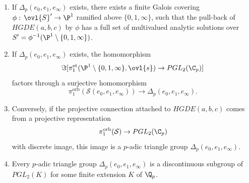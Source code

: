 \begin{pro}\label{pro::5.2.4}
 \begin{enumerate}
  \renewcommand{\theenumi}{\alph{enumi}}
  \item If $\Delta_p(e_0,e_1,e_\infty)$ exists,
	there exists a finite Galois covering 
	$\phi:\,\ovl{S}' \to \P^1$ ramified above $\{0,1,\infty\}$, such that
	the pull-back of $ HGDE(a,b,c) $ by $\phi$ has a full 
	set of multivalued analytic solutions over
	$S'=\phi^{-1}(\P^1\setminus\{0,1,\infty\})$.
  \item If $\Delta_p(e_0,e_1,e_\infty)$ exists, the homomorphism
	\begin{equation*}
	 \Im[\pi_1^{\mathrm{et}}(\P^1\setminus\{0,1,\infty\},\ovl{s})\to
	 PGL_2(\C_p)]
	\end{equation*}
	factors through a surjective homomorphism 
	\begin{equation*}
	 \pi_1^{\mathrm{orb}}(\mathcal{S}(e_0,e_1,e_\infty)) \to
	  \Delta_p(e_0,e_1,e_\infty). 
	\end{equation*}
  \item Conversely, if the projective connection attached to $HGDE(a,b,c)$
	comes from a projective representation
	\begin{equation*}
	 \pi_1^{\mathrm{orb}}(\mathcal{S}) \to  PGL_2(\C_p)
	\end{equation*}
	with discrete image, this image is a $p$-adic triangle group
	$\Delta_p(e_0,e_1,e_\infty)$.
  \item Every $p$-adic triangle group
	$\Delta_p(e_0,e_1,e_\infty)$ is a discontinuous subgroup of
	$PGL_2(K)$ for some finite extension $K$ of $\Q_p$.
 \end{enumerate}
\end{pro}

